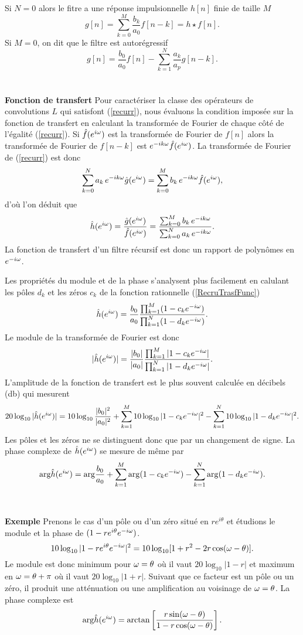 Si $N = 0$ alors le fitre a une r\'eponse impulsionnelle $h[n]$ finie
de taille $M$
\[
g[n] =
\sum_{k=0}^M \frac {b_k} {a_0} f[n-k] = h \star f [n] .
\]
Si $M = 0$, on dit que le filtre est autor\'egressif
\[
g[n] = \frac {b_0} {a_0} f[n] - \sum_{k=1}^N \frac{a_k} {a_p}
g[n-k] .
\]
\\
\\
{\bf Fonction de transfert}
Pour caract\'eriser la classe des op\'erateurs de convolutions $L$
qui satisfont (\ref{recurr}),
nous \'evaluons la condition impos\'ee
sur la fonction de transfert en calculant
la transform\'ee de Fourier de chaque c\^ot\'e de l'\'egalit\'e
(\ref{recurr}).
Si $\hat f({e ^{i \omega}})$ est la transform\'ee de Fourier de $f[n]$
alors la transform\'ee de Fourier
de $f[n-k]$ est $e^{-i k {\omega}} \hat f({e ^{i \omega}})$. La transform\'ee
de Fourier de (\ref{recurr}) est donc
\[
\sum_{k=0}^N a_k \,e^{-ik {\omega}} \hat g({e ^{i \omega}})
=
\sum_{k=0}^M b_k \,e^{-ik{\omega}} \hat f({e ^{i \omega}}) ,
\]
d'o\`u l'on d\'eduit que
\begin{equation}
\label{RecruTrasfFunc}
\hat h({e ^{i \omega}}) = \frac {\hat g({e ^{i \omega}})} {\hat f({e ^{i \omega}})} =
\frac {\sum_{k=0}^M b_k \,e^{-ik{\omega}}} {\sum_{k=0}^N a_k \,
e^{-ik{\omega}} }.
\end{equation}
La fonction de transfert d'un filtre r\'ecursif est donc un rapport
de polyn\^{o}mes en $e^{-i{\omega}}$.

Les propri\'et\'es du module
et de la phase s'analysent plus facilement en calulant les
p\^oles $d_k$ et les z\'eros $c_k$ de la fonction rationnelle
(\ref{RecruTrasfFunc})
\[
\hat h({e ^{i \omega}}) = \frac {b_0} {a_0} \frac
{\prod_{k=1}^M (1 - c_k e^{-i{\omega}})} {\prod_{k=1}^N (1 - d_k e^{-i{\omega}})} .
\]
Le module de la transform\'ee de Fourier est donc
\[
|\hat h({e ^{i \omega}})| = \frac {|b_0|} {|a_0|} \frac
{\prod_{k=1}^M |1 - c_k {e ^{-i \omega}}|} {\prod_{k=1}^N |1 - d_k {e ^{-i \omega}}|} .
\]
L'amplitude de la fonction de transfert
est le plus souvent calcul\'ee en d\'ecibels (db) qui mesurent
\[
20 \log_{10} |\hat h({e ^{i \omega}})| =
10 \log_{10} \frac {|b_0|^2} {|a_0|^2} +
\sum _{k=1}^M 10 \log_{10} |1 - c_k {e ^{-i \omega}}|^2
- \sum_{k=1}^N 10 \log_{10} |1 - d_k {e ^{-i \omega}}|^2 .
\]
Les p\^oles et les z\'eros ne
se distinguent donc que par un changement
de signe.
La phase complexe de $\hat h({e ^{i \omega}})$ se mesure de m\^eme par
\[
{\rm arg} \hat h({e ^{i \omega}}) = {\rm arg} \frac {b_0} {a_0} +
\sum _{k=1}^M {\rm arg} (1 - c_k {e ^{-i \omega}})
- \sum_{k=1}^N {\rm arg} (1 - d_k {e ^{-i \omega}}) .
\]
\\
\\
{\bf Exemple}
Prenons le cas d'un p\^ole ou d'un z\'ero situ\'e en $re^{i\theta}$
et \'etudions le module et la phase de $(1-r e^{i \theta} {e ^{-i \omega}})$.
\[
10 \log_{10} |1-r e^{i \theta} {e ^{-i \omega}}|^2 =
10 \log_{10} [ 1 + r^2 - 2r\cos({\omega} - \theta) ] .
\]
Le module est donc minimum pour ${\omega} = \theta$ o\`u il vaut
$20 \log_{10} |1-r|$ et
maximum en ${\omega} = \theta + \pi$ o\`u il vaut
$20 \log_{10} |1+r|$.
Suivant que ce facteur est un p\^ole ou un z\'ero, il produit
une att\'enuation ou une
amplification au voisinage de ${\omega} = \theta$.
La phase complexe est
\[
{\rm arg}\hat h({e ^{i \omega}}) = \arctan \left[
\frac {r \sin({\omega} - \theta)} {1 -r \cos({\omega} - \theta)} \right] .
\]

